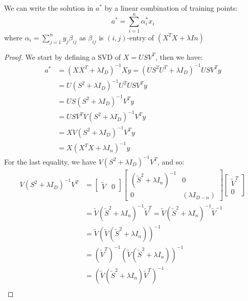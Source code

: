 \begin{theorem}
    \label{thm:ridge-regression-soln}
    We can write the solution in $a^*$ by a linear combination of training points:
    \begin{equation*}
        a^* = \sum^n_{i=1}\alpha^*_ix_i
    \end{equation*}  
    where $\alpha_i = \sum^n_{j=1}y_j\beta_{ij}$ as $\beta_{ij}$ is $(i,j)$-entry of $(X^TX+\lambda In)$
\end{theorem}
\begin{proof}
    We start by defining a SVD of $X = USV^T$, then we have:
    \begin{equation*}
    \begin{aligned}
        a^* &= (XX^T+\lambda I_D)^{-1}Xy = (US^2U^T + \lambda I_D)^{-1}USV^Ty \\
        &= U(S^2 + \lambda I_D)^{-1}U^TUSV^Ty \\
        &= US(S^2 + \lambda I_D)^{-1}V^Ty \\ 
        &= USV^TV(S^2 + \lambda I_D)^{-1}V^Ty \\ 
        &= XV(S^2+\lambda I_D)^{-1}V^Ty \\
        &= X(X^TX + \lambda I_n)^{-1}y
    \end{aligned}
    \end{equation*}
    For the last equality, we have $V(S^2+\lambda I_D)^{-1}V^T$, and so:
    \begin{equation*}
    \begin{aligned}
        V(S^2+\lambda I_D)^{-1}V^T &= \begin{bmatrix}
            \tilde{V} & 0
        \end{bmatrix}  \begin{bmatrix}
            (\tilde{S}^2+\lambda I_n)^{-1} & 0 \\
            0 & (\lambda I_{D-n})
        \end{bmatrix} \begin{bmatrix}
            \tilde{V}^T \\ 0
        \end{bmatrix} \\
        &= \tilde{V}(\tilde{S}^2+\lambda I_n)^{-1}\tilde{V}^T = \tilde{V}(\tilde{S}^2+\lambda I_n)^{-1} \tilde{V}^{-1} \\
        &= \tilde{V}(\tilde{V}(\tilde{S}^2 + \lambda I_n))^{-1} \\
        &= (\tilde{V}^T)^{-1}(\tilde{V}(\tilde{S}^2 + \lambda I_n))^{-1} \\
        &= (\tilde{V}(\tilde{S}^2 + \lambda I_n)\tilde{V}^T)^{-1} \\

\end{aligned}
\end{equation*}
\end{proof}
